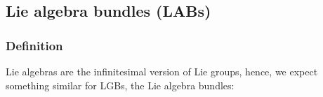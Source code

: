 \documentclass[reqno,a4paper,oneside]{amsart}
\theoremstyle{plain}
\theoremstyle{remark}
\theoremstyle{definition}
\def\bas#1\eas{\begin{align*}#1\end{align*}}
\begin{document}
%
%


\subsection{Lie algebra bundles (LABs)}

\subsubsection{Definition}

Lie algebras are the infinitesimal version of Lie groups, hence, we expect something similar for LGBs, the Lie algebra bundles:
\end{document}
